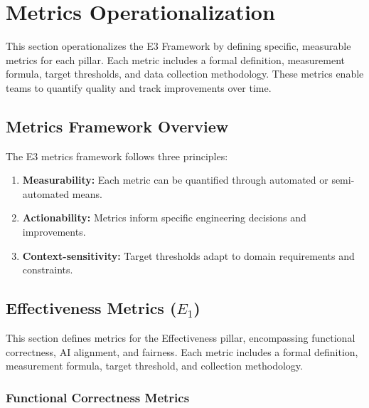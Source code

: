 
\section{Metrics Operationalization}
\label{sec:metrics_operationalization}

This section operationalizes the E3 Framework by defining specific, measurable metrics for each pillar. Each metric includes a formal definition, measurement formula, target thresholds, and data collection methodology. These metrics enable teams to quantify quality and track improvements over time.

\subsection{Metrics Framework Overview}

The E3 metrics framework follows three principles:

\begin{enumerate}[leftmargin=2em]
    \item \textbf{Measurability:} Each metric can be quantified through automated or semi-automated means.
    \item \textbf{Actionability:} Metrics inform specific engineering decisions and improvements.
    \item \textbf{Context-sensitivity:} Target thresholds adapt to domain requirements and constraints.
\end{enumerate}

\subsection{Effectiveness Metrics (\texorpdfstring{$E_1$}{E1})}

This section defines metrics for the Effectiveness pillar, encompassing functional correctness, AI alignment, and fairness. Each metric includes a formal definition, measurement formula, target threshold, and collection methodology.

\subsubsection{Functional Correctness Metrics}

